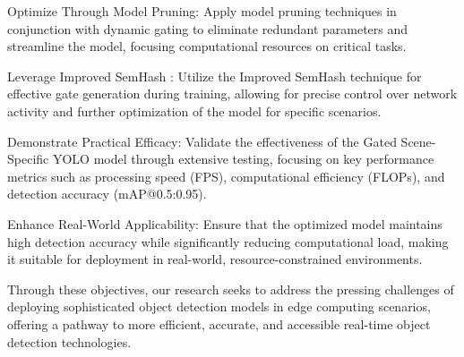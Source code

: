 Optimize Through Model Pruning: Apply model pruning techniques in conjunction with dynamic gating to eliminate redundant parameters and streamline the model, focusing computational resources on critical tasks.

Leverage Improved SemHash \cite*{kaiser2018discrete}: Utilize the Improved SemHash technique for effective gate generation during training, allowing for precise control over network activity and further optimization of the model for specific scenarios.

Demonstrate Practical Efficacy: Validate the effectiveness of the Gated Scene-Specific YOLO model through extensive testing, focusing on key performance metrics such as processing speed (FPS), computational efficiency (FLOPs), and detection accuracy (mAP@0.5:0.95).

Enhance Real-World Applicability: Ensure that the optimized model maintains high detection accuracy while significantly reducing computational load, making it suitable for deployment in real-world, resource-constrained environments.

Through these objectives, our research seeks to address the pressing challenges of deploying sophisticated object detection models in edge computing scenarios, offering a pathway to more efficient, accurate, and accessible real-time object detection technologies.

\clearpage

